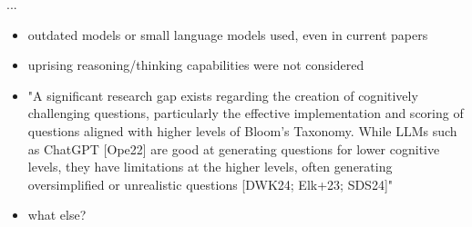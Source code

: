 \vspace{3em}\pagebreak

 ...



\begin{itemize}
    \item outdated models or small language models used, even in current papers
    \item uprising reasoning/thinking capabilities were not considered
    \item "A significant research gap exists regarding the creation of
cognitively challenging questions, particularly the effective implementation and scoring of questions
aligned with higher levels of Bloom's Taxonomy. While LLMs such as ChatGPT [Ope22] are good
at generating questions for lower cognitive levels, they have limitations at the higher levels, often
generating oversimplified or unrealistic questions [DWK24; Elk+23; SDS24]"
    \item what else?
\end{itemize}